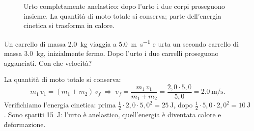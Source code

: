 \begin{figure}[!htbp]
    \centering
    \caption{Urto completamente anelastico: dopo l'urto i due corpi proseguono insieme. La quantità di moto totale si conserva; parte dell'energia cinetica si trasforma in calore.}
    \label{fig:urto-anelastico}
\end{figure}

\begin{testexample}
Un carrello di massa \SI{2,0}{\kilo\gram} viaggia a \SI{5,0}{\metre\per\second} e urta un secondo carrello di massa \SI{3,0}{\kilo\gram}, inizialmente fermo. Dopo l'urto i due carrelli proseguono agganciati. Con che velocità?

La quantità di moto totale si conserva:
\[ m_1\,v_1 = (m_1 + m_2)\,v_f \;\Longrightarrow\; v_f = \frac{m_1\,v_1}{m_1 + m_2} = \frac{2{,}0 \cdot 5{,}0}{5{,}0} = \SI{2,0}{\metre\per\second}. \]
Verifichiamo l'energia cinetica: prima $\tfrac12 \cdot 2{,}0 \cdot 5{,}0^2 = \SI{25}{\joule}$, dopo $\tfrac12 \cdot 5{,}0 \cdot 2{,}0^2 = \SI{10}{\joule}$. Sono spariti \SI{15}{\joule}: l'urto è anelastico, quell'energia è diventata calore e deformazione.
\end{testexample}

